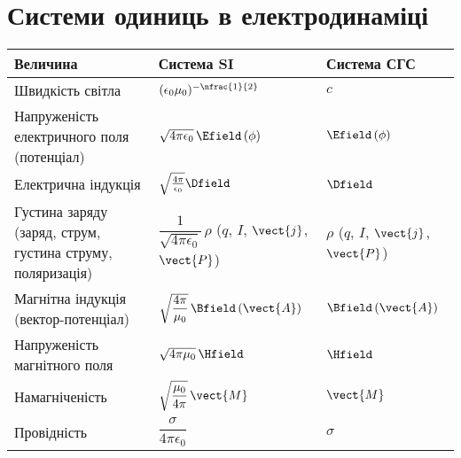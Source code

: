 
\newpage
\section{Системи одиниць в електродинаміці}\label{SItoGauss}

\begin{table}[h!]\centering
	\label{tab:SItoGaussFormulae}
	\small
	\begin{tabular}{M{7.5cm}ll}
		\toprule
		Величина                                                   & Система SI                                                                   & Система СГС                               \\ \midrule
		Швидкість світла                                           & $(\epsilon_0\mu_0)^{-\nfrac{1}{2}}$                                          & $c$                                       \\
		Напруженість електричного поля (потенціал)                 & $\sqrt{4\pi\epsilon_0}\,\Efield \, (\phi)$                                   & $\Efield \, (\phi)$                       \\
		Електрична індукція                                        & $\sqrt{\frac{4\pi}{\epsilon_0}} \Dfield$                                     & $\Dfield$                                 \\
		Густина заряду (заряд, струм, густина струму, поляризація) & $\dfrac{1}{\sqrt{4\pi\epsilon_0}}\, \rho$ ($q$, $I$, $\vect{j}$, $\vect{P}$) & $\rho$ ($q$, $I$, $\vect{j}$, $\vect{P}$) \\
		Магнітна індукція (вектор-потенціал)                       & $\sqrt{\dfrac{4\pi}{\mu_0}}\,\Bfield\, (\vect{A})$                           & $\Bfield\, (\vect{A})$                    \\
		Напруженість магнітного поля                               & $\sqrt{4\pi \mu_0}\,\Hfield$                                                 & $\Hfield$                                 \\
		Намагніченість                                             & $\sqrt{\dfrac{\mu_0}{4\pi}}\, \vect{M}$                                      & $\vect{M}$                                \\
		Провідність                                                & $\dfrac{\sigma}{4\pi\epsilon_0}$                                             & $\sigma$                                  \\

\end{tabular}
\end{table}
